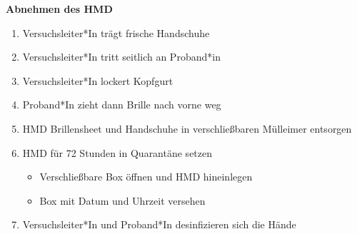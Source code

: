 \documentclass[24pt, a4paper, portrait]{article}
\begin{document}
\vspace{0.5cm}

\Large
\textbf{Abnehmen des HMD}

\large

\begin{enumerate}
    \item Versuchsleiter*In trägt frische Handschuhe
    \item Versuchsleiter*In tritt seitlich an Proband*in
    \item Versuchsleiter*In lockert Kopfgurt
    \item Proband*In zieht dann Brille nach vorne weg
    \item HMD Brillensheet und Handschuhe in verschließbaren Mülleimer entsorgen
    \item HMD für 72 Stunden in Quarantäne setzen
    \begin{itemize}
        \item Verschließbare Box öffnen und HMD hineinlegen
        \item Box mit Datum und Uhrzeit versehen
    \end{itemize}
    \item Versuchsleiter*In und Proband*In desinfizieren sich die Hände
\end{enumerate}
\end{document}
